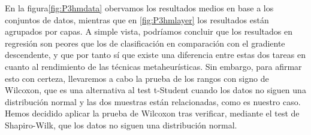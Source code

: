 En la figura\ref{fig:P3hmdata} obervamos los resultados medios en base a los conjuntos de datos, mientras que en \ref{fig:P3hmlayer} los resultados están agrupados por capas. A simple vista, podríamos concluir que los resultados en regresión son peores que los de clasificación en comparación con el gradiente descendente, y que por tanto sí que existe una diferencia entre estas dos tareas en cuanto al rendimiento de las técnicas metaheurísticas. Sin embargo, para afirmar esto con certeza, llevaremos a cabo la prueba de los rangos con signo de Wilcoxon, que es una alternativa al test t-Student cuando los datos no siguen una distribución normal y las dos muestras están relacionadas, como es nuestro caso. Hemos decidido aplicar la prueba de Wilcoxon tras verificar, mediante el test de Shapiro-Wilk, que los datos no siguen una distribución normal.


